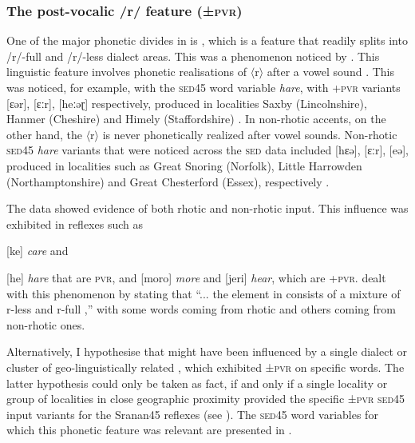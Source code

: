 {\subsubsection{The post-vocalic /r/ feature (±\textsc{pvr})} \label{3.3.2.2}
One of the major phonetic divides in  is , which is a feature that readily splits  into /r/-full and /r/-less dialect areas. This was a phenomenon noticed by \citet{Wells82}. This linguistic feature involves phonetic realisations of $\langle$r$\rangle$ after a vowel sound \citep{Roca99}. This was noticed, for example, with the \textsc{sed45} word variable \emph{hare}, with +\textsc{pvr} variants [ɛər], [ɛːr], [heːəɽ] respectively, produced in localities Saxby (Lincolnshire), Hanmer (Cheshire) and Himely (Staffordshire) \citep{Orton70b}. In non-rhotic accents, on the other hand, the $\langle$r$\rangle$ is never phonetically realized after vowel sounds. Non-rhotic \textsc{sed45} \emph{hare} variants that were noticed across the \textsc{sed} data included [hɛə], [ɛːr], [eə], produced in localities such as Great Snoring (Norfolk), Little Harrowden (Northamptonshire) and Great Chesterford (Essex), respectively \citep{Orton70}.

The  data showed evidence of both rhotic and non-rhotic  input. This influence was exhibited in  reflexes such as {[ke] \emph{care} and {[he] \emph{hare} that are \textminus\textsc{pvr}, and  [moro] \emph{more} and [jeri] \emph{hear}, which are +\textsc{pvr}. \citet[30]{Smith87} dealt with this phenomenon by stating that ``... the  element in  consists of a mixture of r-less and r-full ,'' with some words coming from rhotic  and others coming from non-rhotic ones.

Alternatively, I hypothesise that  might have been influenced by a single dialect or cluster of geo-linguistically related , which exhibited ±\textsc{pvr} on specific words. The latter hypothesis could only be taken as fact, if and only if a single locality or group of localities in close geographic proximity provided the specific ±\textsc{pvr} \textsc{sed45} input variants for the Sranan45 reflexes (see ). The \textsc{sed45} word variables for which this phonetic feature was relevant are presented in .

}}}
